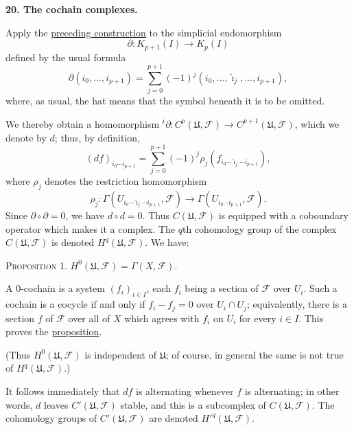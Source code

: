 
\medskip
{}\label{fac:I:3:no:20}
\textbf{20. The cochain complexes.}

Apply the \hyperref[fac:I:3:no:19]{preceding construction} to the simplicial endomorphism
\[
\partial:K_{p+1}(I)\longrightarrow K_p(I)
\]
defined by the usual formula
\[
\partial(i_0,\ldots,i_{p+1})
=\sum_{j=0}^{p+1}(-1)^j
(i_0,\ldots,\widehat{\imath}_j,\ldots,i_{p+1}),
\]
where, as usual, the hat means that the symbol beneath it is to be omitted.

We thereby obtain a homomorphism ${}^{t}\partial:C^p(\mathfrak{U},\mathcal{F})\to C^{p+1}(\mathfrak{U},\mathcal{F})$, which we denote by $d$; thus, by definition,
\[
(df)_{i_0\cdots i_{p+1}}
=\sum_{j=0}^{p+1}(-1)^j\rho_j
(f_{i_0\cdots\widehat{\imath}_j\cdots i_{p+1}}),
\]
where $\rho_j$ denotes the restriction homomorphism
\[
\rho_j:\Gamma(U_{i_0\cdots\widehat{\imath}_j\cdots i_{p+1}},\mathcal{F})
\longrightarrow
\Gamma(U_{i_0\cdots i_{p+1}},\mathcal{F}).
\]
Since $\partial\circ\partial=0$, we have $d\circ d=0$. Thus $C(\mathfrak{U},\mathcal{F})$ is equipped with a coboundary operator which makes it a complex. The $q$th cohomology group of the complex $C(\mathfrak{U},\mathcal{F})$ is denoted $H^q(\mathfrak{U},\mathcal{F})$. We have:

\label{fac:I:3:no:20:prop:1}
\textsc{Proposition 1.} $H^0(\mathfrak{U},\mathcal{F})=\Gamma(X,\mathcal{F})$.

A $0$-cochain is a system $(f_i)_{i\in I}$, each $f_i$ being a section of $\mathcal{F}$ over $U_i$. Such a cochain is a cocycle if and only if $f_i-f_j=0$ over $U_i\cap U_j$; equivalently, there is a section $f$ of $\mathcal{F}$ over all of $X$ which agrees with $f_i$ on $U_i$ for every $i\in I$. This proves the \hyperref[fac:I:3:no:20:prop:1]{proposition}.

(Thus $H^0(\mathfrak{U},\mathcal{F})$ is independent of $\mathfrak{U}$; of course, in general the same is not true of $H^q(\mathfrak{U},\mathcal{F})$.)

It follows immediately that $df$ is alternating whenever $f$ is alternating; in other words, $d$ leaves $C'(\mathfrak{U},\mathcal{F})$ stable, and this is a subcomplex of $C(\mathfrak{U},\mathcal{F})$. The cohomology groups of $C'(\mathfrak{U},\mathcal{F})$ are denoted $H'^{q}(\mathfrak{U},\mathcal{F})$.

